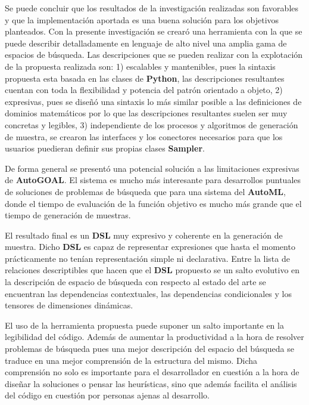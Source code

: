 \begin{conclusions}
      Se puede concluir que los resultados de la investigación realizadas son favorables
      y que la implementación aportada es una buena solución para los objetivos planteados.
      Con la presente investigación se crearó una herramienta con la que se puede describir
      detalladamente en lenguaje de alto nivel una amplia gama de espacios de búsqueda.
      Las descripciones que se pueden realizar con la explotación de la propuesta realizada
      son: 1) escalables y mantenibles, pues la sintaxis propuesta esta basada en las
      clases de {\bf Python}, las descripciones resultantes cuentan con toda la flexibilidad y potencia
      del patrón orientado a objeto, 2) expresivas, pues se diseñó una sintaxis lo más
      similar posible a las definiciones de dominios matemáticos por lo que las descripciones resultantes suelen
      ser muy concretas y legibles, 3) independiente de los procesos y algoritmos de generación de
      muestra, se crearon las interfaces y los conectores necesarios para que los usuarios
      puedieran definir sus propias clases {\bf Sampler}.

      De forma general se presentó una potencial solución a las limitaciones expresivas de {\bf AutoGOAL}.
      El sistema es mucho más interesante para desarrollos puntuales de
      soluciones de problemas de búsqueda que para una sistema del {\bf AutoML}, donde el tiempo de evaluación
      de la función objetivo es mucho más grande que el tiempo de generación de muestras.

      El resultado final es un {\bf DSL} muy expresivo y coherente en la generación de muestra. Dicho {\bf DSL} es
      capaz de representar expresiones que hasta el momento prácticamente no tenían representación simple
      ni declarativa. Entre la lista de relaciones descriptibles que hacen que el {\bf DSL} propuesto se un
      salto evolutivo en la descripción de espacio de búsqueda con respecto al estado del arte se
      encuentran las dependencias contextuales, las dependencias condicionales y los tensores de
      dimensiones dinámicas.

      El uso de la herramienta propuesta puede suponer un salto importante en la
      legibilidad del código. Además de aumentar la productividad a la hora de resolver problemas de
      búsqueda pues una mejor descripción del espacio del búsqueda se traduce en una mejor comprensión
      de la estructura del mismo. Dicha comprensión no solo es importante para el desarrollador en
      cuestión a la hora de diseñar la soluciones o pensar las heurísticas, sino que además facilita
      el análisis del código en cuestión por personas ajenas al desarrollo.
\end{conclusions}
